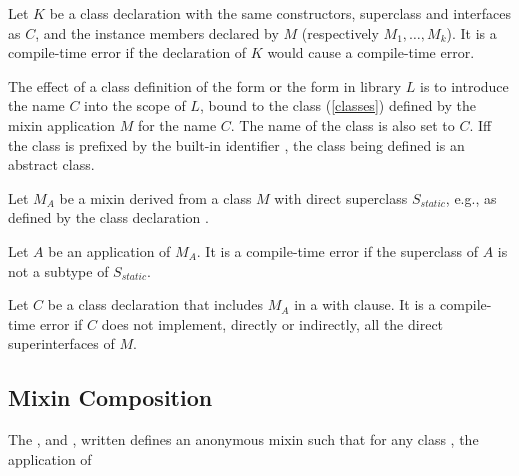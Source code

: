\documentclass[makeidx]{article}
\begin{document}
\LMHash{}%
Let $K$ be a class declaration with the same constructors, superclass and interfaces as $C$, and the instance members declared by $M$ (respectively $M_1, \ldots, M_k$).
It is a compile-time error if the declaration of $K$ would cause a compile-time error.


\LMHash{}%
The effect of a class definition of the form  or the form  in library $L$ is to introduce the name $C$ into the scope of $L$, bound to the class (\ref{classes}) defined by the mixin application $M$ for the name $C$.
The name of the class is also set to $C$.
If{}f the class is prefixed by the built-in identifier \ABSTRACT{}, the class being defined is an abstract class.

\LMHash{}%
Let $M_A$ be a mixin derived from a class $M$ with direct superclass $S_{static}$, e.g., as defined by the class declaration .

\LMHash{}%
Let $A$ be an application of $M_A$.
It is a compile-time error if the superclass of $A$ is not a subtype of $S_{static}$.

\LMHash{}%
Let $C$ be a class declaration that includes $M_A$ in a with clause.
It is a compile-time error if $C$ does not implement, directly or indirectly, all the direct superinterfaces of $M$.


\subsection{Mixin Composition}


\LMHash{}%
The ,
 and
, written
defines an anonymous mixin such that for any class
,
the application of
\end{document}
